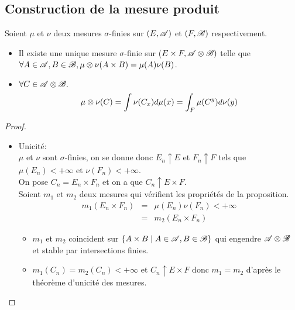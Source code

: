 \subsection{Construction de la mesure produit}

\begin{theorem}
	Soient $\mu$ et $\nu$ deux mesures $\sigma$-finies sur $(E, \mathscr{A})$ et $(F, \mathscr{B})$ respectivement.

	\begin{itemize}
		\item Il existe une unique mesure $\sigma$-finie sur ($E \times F, \mathscr{A} \otimes \mathscr{B})$ telle que $\forall A \in \mathscr{A}, B \in \mathscr{B}, \mu \otimes \nu(A \times B) = \mu(A) \nu(B)$.
		\item $\forall C \in \mathscr{A} \otimes \mathscr{B}. $
		      $$ \mu \otimes \nu(C) = \int \nu(C_x) d \mu(x) = \int_F \mu(C^y) d \nu(y) $$
	\end{itemize}
\end{theorem}

\begin{proof}
	\begin{itemize}
		\item  Unicité:\\
		      $\mu$ et $\nu$ sont $\sigma$-finies, on se donne donc $E_n \uparrow E$ et $F_n \uparrow F$ tels que $\mu(E_n) < +\infty$ et $\nu(F_n) < +\infty$.\\
		      On pose $C_n = E_n \times F_n$ et on a que $C_n \uparrow E \times F$.\\
		      Soient $m_1$ et $m_2$ deux mesures qui vérifient les propriétés de la proposition.\\
		      \begin{eqnarray*}
			      m_1(E_n \times F_n) &=& \mu(E_n) \nu(F_n) < +\infty \\
			      & = & m_2(E_n \times F_n)
		      \end{eqnarray*}

		      \begin{itemize}
			      \item $m_1$ et $m_2$ coincident sur $\left\{A \times B \mid A \in \mathscr{A}, B \in \mathscr{B}\right\}$ qui engendre $\mathscr{A} \otimes \mathscr{B}$ et stable par intersections finies.
			      \item $m_1 (C_n) = m_2(C_n) < +\infty$ et $C_n \uparrow E \times F$ donc $m_1 = m_2$ d'après le théorème d'unicité des mesures.
		      \end{itemize}
	\end{itemize}
\end{proof}

